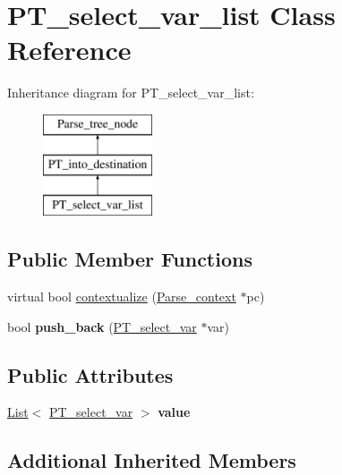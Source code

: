 \hypertarget{classPT__select__var__list}{}\section{P\+T\+\_\+select\+\_\+var\+\_\+list Class Reference}
\label{classPT__select__var__list}
Inheritance diagram for P\+T\+\_\+select\+\_\+var\+\_\+list\+:\begin{figure}[H]
\begin{center}
\leavevmode
\includegraphics[height=3.000000cm]{classPT__select__var__list}
\end{center}
\end{figure}
\subsection*{Public Member Functions}
\begin{DoxyCompactItemize}
\item 
virtual bool \mbox{\hyperlink{classPT__select__var__list_a5b792bf23c127377a3ff4fc30c298fcd}{contextualize}} (\mbox{\hyperlink{structParse__context}{Parse\+\_\+context}} $\ast$pc)
\item 
\mbox{\label{classPT__select__var__list_ad2670f453593396426915f44b9b5e7a0}} 
bool {\bfseries push\+\_\+back} (\mbox{\hyperlink{classPT__select__var}{P\+T\+\_\+select\+\_\+var}} $\ast$var)
\end{DoxyCompactItemize}
\subsection*{Public Attributes}
\begin{DoxyCompactItemize}
\item 
\mbox{\label{classPT__select__var__list_a6198a7381274ea19a8412656519254d7}} 
\mbox{\hyperlink{classList}{List}}$<$ \mbox{\hyperlink{classPT__select__var}{P\+T\+\_\+select\+\_\+var}} $>$ {\bfseries value}
\end{DoxyCompactItemize}
\subsection*{Additional Inherited Members}


